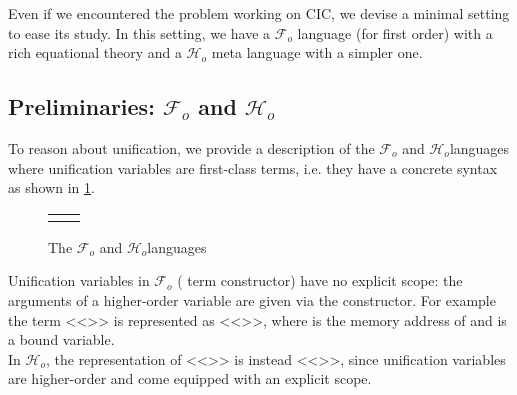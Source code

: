 \documentclass[sigconf,natbib=false,review]{acmart}
\newcommand{\llambda}{\ensuremath{\mathcal{L}}\xspace}
\newcommand{\Fo}{\texorpdfstring{\ensuremath{\mathcal{F}_{\!o}\xspace}}{Fo}} %
\newcommand{\Ho}{\texorpdfstring{\ensuremath{\mathcal{H}_o}\xspace}{Ho}}
\begin{document}
\newcommand{\maybeeta}{\texorpdfstring{\ensuremath{\Diamond\eta}\xspace}{maybeeta}}
\newcommand{\maybebeta}{\texorpdfstring{\ensuremath{\Diamond\beta}\xspace}{maybebeta}}
\newcommand{\notllambda}{\texorpdfstring{\ensuremath{\Diamond\llambda}\xspace}{maybellam}}

Even if we encountered the problem working on CIC, we devise
a minimal setting to ease its study. In this setting, we have
a \Fo{} language (for first order) with a rich equational
theory and a \Ho{} meta language with a simpler one.


\subsection{Preliminaries: \Fo{} and \Ho{}}

To reason about unification, we provide a description of the
\Fo{} and \Ho languages where unification variables
are first-class terms, i.e. they have a concrete syntax as
shown in \cref{code:common-terms}.
%
{
\setlength{\abovecaptionskip}{0pt}
\setlength{\belowcaptionskip}{-13pt}
\begin{figure}[b] %
  \begin{tabular}{ll}
  \begin{minipage}{0.21\textwidth}
   {code/fo_tm}
  \end{minipage}
  &
  \begin{minipage}{0.24\textwidth}
   {code/ho_tm}
  \end{minipage}
  \end{tabular}\vspace{4pt}
  \caption{The \Fo{} and \Ho languages}\vspace{0.3em}
  \label{code:common-terms}
\end{figure}
}
Unification variables
in \Fo{} ( term constructor) have no explicit scope:
the arguments of a higher-order variable are given via the 
constructor. For example the term <<>> is represented as
<<>>, where  is the memory address
of  and  is a bound variable.\\
In \Ho, the representation of <<>> is instead <<>>,
since unification variables are higher-order and come equipped with an
explicit scope.
%
\end{document}
